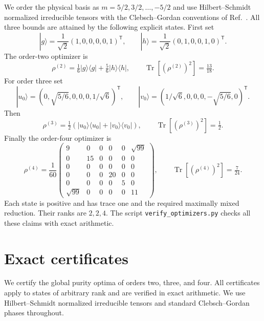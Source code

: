 \documentclass[11pt]{article}
\DeclareMathOperator{\Tr}{Tr}
\begin{document}
We order the physical basis as $m=5/2,3/2,\ldots,-5/2$ and use Hilbert--Schmidt normalized irreducible tensors with the Clebsch--Gordan conventions of Ref.~\cite{Varshalovich1988}. All three bounds are attained by the following explicit states. First set
\begin{equation}
 |g\rangle=\frac{1}{\sqrt2}(1,0,0,0,0,1)^{\mathsf T},\qquad
 |h\rangle=\frac{1}{\sqrt2}(0,1,0,0,1,0)^{\mathsf T}.
\end{equation}
The order-two optimizer is
\begin{equation}\label{eq:j5o2_2AC}
 \rho^{(2)}=\tfrac16|g\rangle\langle g|+\tfrac56|h\rangle\langle h|,
 \qquad \Tr[(\rho^{(2)})^2]=\tfrac{13}{18}.
\end{equation}
For order three set
\begin{equation}
 |u_0\rangle=(0,\sqrt{5/6},0,0,0,1/\sqrt6)^{\mathsf T},\qquad
 |v_0\rangle=(1/\sqrt6,0,0,0,-\sqrt{5/6},0)^{\mathsf T}.
\end{equation}
Then
\begin{equation}\label{eq:j5o2_3AC}
 \rho^{(3)}=\tfrac12(|u_0\rangle\langle u_0|+|v_0\rangle\langle v_0|),
 \qquad \Tr[(\rho^{(3)})^2]=\tfrac12.
\end{equation}
Finally the order-four optimizer is
\begin{equation}\label{eq:rank4_matrix}
 \rho^{(4)}=\frac1{60}\begin{pmatrix}
 9&0&0&0&0&\sqrt{99}\\
 0&15&0&0&0&0\\
 0&0&0&0&0&0\\
 0&0&0&20&0&0\\
 0&0&0&0&5&0\\
 \sqrt{99}&0&0&0&0&11
 \end{pmatrix},\qquad \Tr[(\rho^{(4)})^2]=\tfrac7{24}.
\end{equation}
Each state is positive and has trace one and the required maximally mixed reduction. Their ranks are $2,2,4$. The script \texttt{verify\_optimizers.py} checks all these claims with exact arithmetic.

\section{Exact certificates}
\label{app:spin52_purity}
We certify the global purity optima of orders two, three, and four. All certificates apply to states of arbitrary rank and are verified in exact arithmetic. We use Hilbert--Schmidt normalized irreducible tensors and standard Clebsch--Gordan phases throughout.
\end{document}
